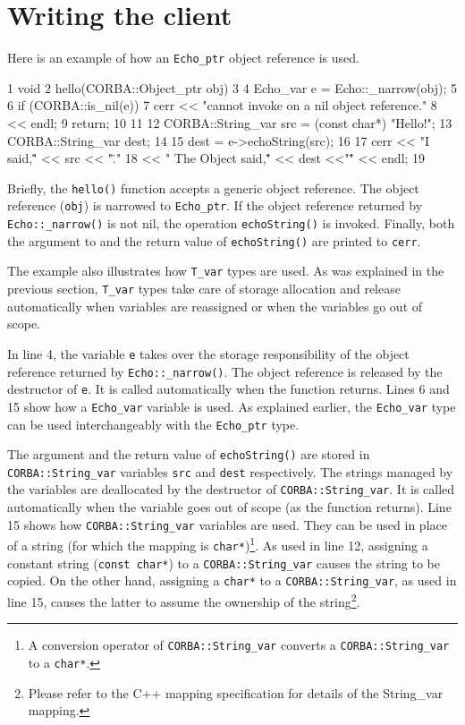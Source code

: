 \documentclass[11pt,twoside,a4paper]{book}
\newcommand{\type}[1]{\texttt{#1}}
\newcommand{\code}[1]{\texttt{#1}}
\newcommand{\op}[1]{\texttt{#1()}}
\newcommand{\dsc}{\discretionary{}{}{}}
\begin{document}
\section{Writing the client}

Here is an example of how an \type{Echo\_ptr} object reference is
used.

\lstset{stepnumber=1,gobble=4}
\begin{cxxlisting}
 1  void
 2  hello(CORBA::Object_ptr obj)
 3  {
 4    Echo_var e = Echo::_narrow(obj);
 5
 6    if (CORBA::is_nil(e)) {
 7      cerr << "cannot invoke on a nil object reference."
 8           << endl;
 9      return;
10    }
11
12    CORBA::String_var src = (const char*) "Hello!";
13    CORBA::String_var dest;
14
15    dest = e->echoString(src);
16
17    cerr << "I said,\"" << src << "\"."
18         << " The Object said,\"" << dest <<"\"" << endl;
19  }
\end{cxxlisting}
\lstset{stepnumber=0,gobble=0}

Briefly, the \op{hello} function accepts a generic object reference.
The object reference (\code{obj}) is narrowed to \type{Echo\_ptr}. If
the object reference returned by \op{Echo::\_narrow} is not nil, the
operation \op{echoString} is invoked. Finally, both the argument to
and the return value of \op{echoString} are printed to \code{cerr}.

The example also illustrates how \type{T\_var} types are used. As was
explained in the previous section, \type{T\_var} types take care of
storage allocation and release automatically when variables are
reassigned or when the variables go out of scope.

In line 4, the variable \code{e} takes over the storage responsibility
of the object reference returned by \op{Echo::\_narrow}. The object
reference is released by the destructor of \code{e}. It is called
automatically when the function returns. Lines 6 and 15 show how a
\type{Echo\_var} variable is used. As explained earlier, the
\type{Echo\_var} type can be used interchangeably with the
\type{Echo\_ptr} type.

The argument and the return value of \op{echoString} are stored in
\type{CORBA::\dsc{}String\_var} variables \code{src} and \code{dest}
respectively. The strings managed by the variables are deallocated by
the destructor of \type{CORBA::String\_var}. It is called
automatically when the variable goes out of scope (as the function
returns). Line 15 shows how \type{CORBA::String\_var} variables are
used. They can be used in place of a string (for which the mapping is
\type{char*})\footnote{A conversion operator of
\type{CORBA::String\_var} converts a \type{CORBA::\dsc{}String\_var}
to a \type{char*}.}. As used in line 12, assigning a constant string
(\type{const char*}) to a \type{CORBA::String\_var} causes the string
to be copied. On the other hand, assigning a \type{char*} to a
\type{CORBA::String\_var}, as used in line 15, causes the latter to
assume the ownership of the string\footnote{Please refer to the C++
mapping specification for details of the String\_var mapping.}.
\end{document}
